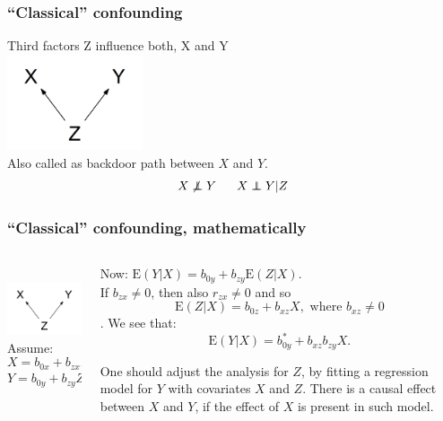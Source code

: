 \documentclass[10pt,dvipsnames,t,handout%
,aspectratio=169%
]{beamer}%
\newcommand{\E}{\mathrm{E}}
\newcommand{\indep}{\perp\!\!\!\!\perp}
\begin{document}
\begin{frame}
	\frametitle{``Classical'' confounding}
	Third factors  Z influence both, X and Y \\
	\includegraphics[width=4cm]{conf1}\\
	Also called as \alert{backdoor path} between $X$ and $Y$. \\
	
$$X \not\indep Y \; \hspace{0.5cm}  X \indep Y|Z$$
	
\end{frame}

\begin{frame}
	\frametitle{``Classical'' confounding, mathematically}
\begin{columns}
\begin{column}{5cm}
\mbox{ } \\
	\includegraphics[width=4cm]{conf1}
	\mbox{}\\[0.5cm]
Assume:
$$X= b_{0x} + b_{zx}Z + \varepsilon_x, \ \E(\varepsilon_x|Z)=0 $$  
$$ Y= b_{0y} + b_{zy}Z + \varepsilon_y, \ \E(\varepsilon_y|Z, X)=0. $$
\end{column}
\begin{column}{7cm}
Now: 
$\E(Y|X) = b_{0y} + b_{zy}\E(Z|X). $ \\[0.2cm]
If  $b_{zx} \ne 0$, then also  $r_{zx} \ne 0$ and so 
$$ \E(Z|X) =  b_{0z}+ b_{xz}X, \mbox{ where }b_{xz} \ne 0$$. 
We see that:
$$\E(Y|X) = b_{0y}^* + b_{xz}b_{zy}X. $$

\begin{block}{}\alert{One should adjust the analysis for $Z$, by fitting a regression model for $Y$ with covariates
	$X$  and $Z$.} 
There is a causal effect between $X$ and $Y$, if the effect of $X$ is present in such model. \end{block}
\end{column}
\end{columns}
\end{frame}
\end{document}
